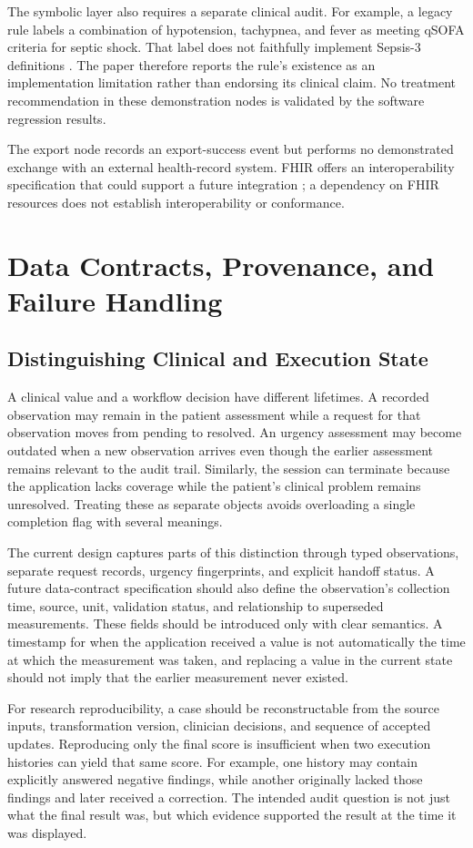 \documentclass[conference]{IEEEtran}
\begin{document}
The symbolic layer also requires a separate clinical audit. For example, a legacy rule labels a combination of hypotension, tachypnea, and fever as meeting qSOFA criteria for septic shock. That label does not faithfully implement Sepsis-3 definitions \cite{sepsis}. The paper therefore reports the rule's existence as an implementation limitation rather than endorsing its clinical claim. No treatment recommendation in these demonstration nodes is validated by the software regression results.

The export node records an export-success event but performs no demonstrated exchange with an external health-record system. FHIR offers an interoperability specification that could support a future integration \cite{fhir}; a dependency on FHIR resources does not establish interoperability or conformance.

\section{Data Contracts, Provenance, and Failure Handling}
\subsection{Distinguishing Clinical and Execution State}
A clinical value and a workflow decision have different lifetimes. A recorded observation may remain in the patient assessment while a request for that observation moves from pending to resolved. An urgency assessment may become outdated when a new observation arrives even though the earlier assessment remains relevant to the audit trail. Similarly, the session can terminate because the application lacks coverage while the patient's clinical problem remains unresolved. Treating these as separate objects avoids overloading a single completion flag with several meanings.

The current design captures parts of this distinction through typed observations, separate request records, urgency fingerprints, and explicit handoff status. A future data-contract specification should also define the observation's collection time, source, unit, validation status, and relationship to superseded measurements. These fields should be introduced only with clear semantics. A timestamp for when the application received a value is not automatically the time at which the measurement was taken, and replacing a value in the current state should not imply that the earlier measurement never existed.

For research reproducibility, a case should be reconstructable from the source inputs, transformation version, clinician decisions, and sequence of accepted updates. Reproducing only the final score is insufficient when two execution histories can yield that same score. For example, one history may contain explicitly answered negative findings, while another originally lacked those findings and later received a correction. The intended audit question is not just what the final result was, but which evidence supported the result at the time it was displayed.
\end{document}
